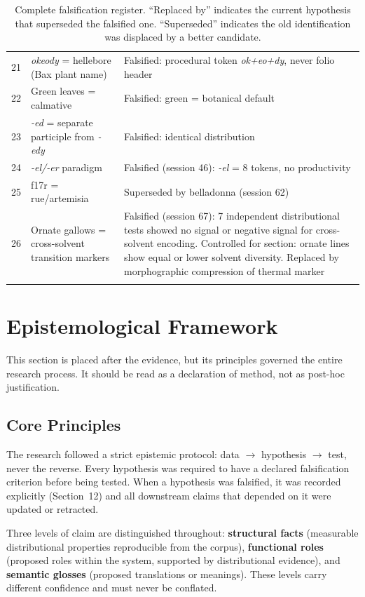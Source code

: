 \documentclass[11pt,a4paper]{article}
\begin{document}
\begin{longtable}{rp{5.5cm}p{6cm}}
21 & \textit{okeody} = hellebore (Bax plant name) & Falsified: procedural token \textit{ok+eo+dy}, never folio header \\
22 & Green leaves = calmative & Falsified: green = botanical default \\
23 & \textit{-ed} = separate participle from \textit{-edy} & Falsified: identical distribution \\
24 & \textit{-el/-er} paradigm & Falsified (session 46): \textit{-el} = 8 tokens, no productivity \\
25 & f17r = rue/artemisia & Superseded by belladonna (session 62) \\
26 & Ornate gallows = cross-solvent transition markers & Falsified (session 67): 7 independent distributional tests showed no signal or negative signal for cross-solvent encoding. Controlled for section: ornate lines show equal or lower solvent diversity. Replaced by morphographic compression of thermal marker \\
\bottomrule
\caption{Complete falsification register. ``Replaced by'' indicates the current hypothesis that superseded the falsified one. ``Superseded'' indicates the old identification was displaced by a better candidate.}
\end{longtable}

\section{Epistemological Framework}

This section is placed after the evidence, but its principles governed the entire research process. It should be read as a declaration of method, not as post-hoc justification.

\subsection{Core Principles}

The research followed a strict epistemic protocol: data $\rightarrow$ hypothesis $\rightarrow$ test, never the reverse. Every hypothesis was required to have a declared falsification criterion before being tested. When a hypothesis was falsified, it was recorded explicitly (Section~12) and all downstream claims that depended on it were updated or retracted.

Three levels of claim are distinguished throughout: \textbf{structural facts} (measurable distributional properties reproducible from the corpus), \textbf{functional roles} (proposed roles within the system, supported by distributional evidence), and \textbf{semantic glosses} (proposed translations or meanings). These levels carry different confidence and must never be conflated.
\end{document}
